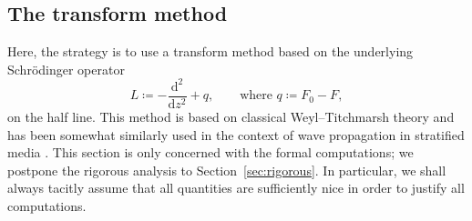 \documentclass[11pt,twoside,reqno,centertags]{amsart}
\theoremstyle{definition}
\newcommand{\dd}{\mathrm d}
\begin{document}
\subsection{The transform method}
Here, the strategy is to use a transform method based on the underlying Schrödinger operator
\[L\coloneqq -\frac{\dd^2}{\dd z^2} + q,\qquad \text{where } q\coloneqq F_0-F,\]
on the half line. This method is based on classical Weyl--Titchmarsh theory \cite{CoddingtinLevinson,Titchmarsh46} and has been somewhat similarly used in the context of wave propagation in stratified media \cite{BonnetEtAl09,DermenjianGuillot,MagnaniniSantosa01,Weder91,Wilcox84}. This section is only concerned with the formal computations; we postpone the rigorous analysis to Section~\ref{sec:rigorous}. In particular, we shall always tacitly assume that all quantities are sufficiently nice in order to justify all computations.
\end{document}
